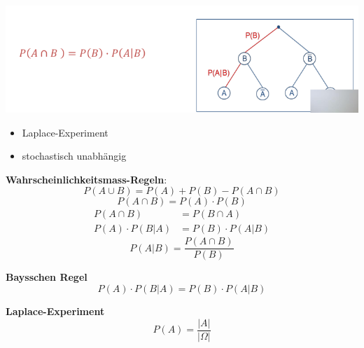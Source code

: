 \documentclass[11pt,twoside,landscape]{article}
\begin{document}
\begin{multicols}{3}
\begin{center}
\end{center}
\begin{center}
\includegraphics[width=.9\linewidth]{img/w06-wahrscheinlichkeit-bedingte.png}
\end{center}

\begin{itemize}
\item Laplace-Experiment
\item stochastisch unabhängig
\end{itemize}

\textbf{Wahrscheinlichkeitsmass-Regeln}:
\begin{equation*}
P(A \cup B) = P(A) + P(B) - P(A \cap B)
\end{equation*}
\begin{equation*}
P(A \cap B) = P(A) \cdot P(B)
\end{equation*}
\begin{align*}
P(A \cap B) &= P(B \cap A) \\
P(A) \cdot P(B|A) &= P(B) \cdot P(A|B)
\end{align*}
\begin{equation*}
P(A|B) = \frac{P(A \cap B)}{P(B)}
\end{equation*}

\textbf{Baysschen Regel}
\begin{equation*}
P(A) \cdot P(B|A) = P(B) \cdot P(A|B)
\end{equation*}

\textbf{Laplace-Experiment}
\begin{equation*}
P(A) = \frac{|A|}{|\Omega|}
\end{equation*}


\end{multicols}
\end{document}
